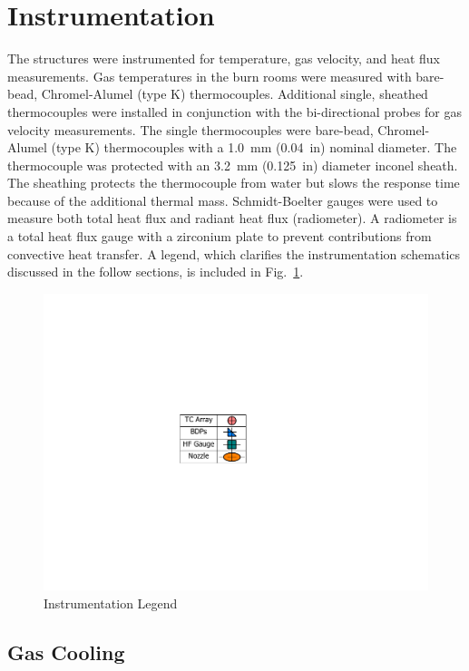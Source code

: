 \documentclass[12pt,oneside]{book}
\begin{document}
\clearpage

\section{Instrumentation}
\label{sec:Instrumentation}

The structures were instrumented for temperature, gas velocity, and heat flux measurements. Gas temperatures in the burn rooms were measured with bare-bead, Chromel-Alumel (type K) thermocouples. Additional single, sheathed thermocouples were installed in conjunction with the bi-directional probes for gas velocity measurements. The single thermocouples were bare-bead, Chromel-Alumel (type K) thermocouples with a 1.0~mm (0.04~in) nominal diameter. The thermocouple was protected with an 3.2~mm (0.125~in) diameter inconel sheath. The sheathing protects the thermocouple from water but slows the response time because of the additional thermal mass. Schmidt-Boelter gauges were used to measure both total heat flux and radiant heat flux (radiometer). A radiometer is a total heat flux gauge with a zirconium plate to prevent contributions from convective heat transfer. A legend, which clarifies the instrumentation schematics discussed in the follow sections, is included in Fig.~\ref{fig:Instrumentation_Legend}.

\begin{figure}[!ht]
	\includegraphics[width=.35\columnwidth]{../Figures/Floor_Plans/PDFs/DelCo_2012_Instrumentation_Legend}
	\caption{Instrumentation Legend}
	\label{fig:Instrumentation_Legend}
\end{figure}

\subsection{Gas Cooling}
\label{subsec:Gas_Cooling_Instrumentation}
\end{document}
